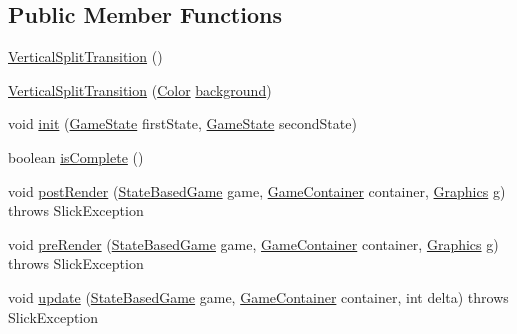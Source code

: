 \subsection*{Public Member Functions}
\begin{DoxyCompactItemize}
\item 
\mbox{\hyperlink{classorg_1_1newdawn_1_1slick_1_1state_1_1transition_1_1_vertical_split_transition_a7fcbd3a7f08c1c24bdeec3871dd3c76f}{Vertical\+Split\+Transition}} ()
\item 
\mbox{\hyperlink{classorg_1_1newdawn_1_1slick_1_1state_1_1transition_1_1_vertical_split_transition_a50db86690430f45012f21202e19c21aa}{Vertical\+Split\+Transition}} (\mbox{\hyperlink{classorg_1_1newdawn_1_1slick_1_1_color}{Color}} \mbox{\hyperlink{classorg_1_1newdawn_1_1slick_1_1state_1_1transition_1_1_vertical_split_transition_ab060d40f8fccd5b704cdfe466e1df6ea}{background}})
\item 
void \mbox{\hyperlink{classorg_1_1newdawn_1_1slick_1_1state_1_1transition_1_1_vertical_split_transition_a1722b29907ee226e0632b6694fe887a7}{init}} (\mbox{\hyperlink{interfaceorg_1_1newdawn_1_1slick_1_1state_1_1_game_state}{Game\+State}} first\+State, \mbox{\hyperlink{interfaceorg_1_1newdawn_1_1slick_1_1state_1_1_game_state}{Game\+State}} second\+State)
\item 
boolean \mbox{\hyperlink{classorg_1_1newdawn_1_1slick_1_1state_1_1transition_1_1_vertical_split_transition_ac2ff9b2c7c657194cfe9e77f2573ef82}{is\+Complete}} ()
\item 
void \mbox{\hyperlink{classorg_1_1newdawn_1_1slick_1_1state_1_1transition_1_1_vertical_split_transition_a54a4f79a015e46a983ff7172be755eb9}{post\+Render}} (\mbox{\hyperlink{classorg_1_1newdawn_1_1slick_1_1state_1_1_state_based_game}{State\+Based\+Game}} game, \mbox{\hyperlink{classorg_1_1newdawn_1_1slick_1_1_game_container}{Game\+Container}} container, \mbox{\hyperlink{classorg_1_1newdawn_1_1slick_1_1_graphics}{Graphics}} g)  throws Slick\+Exception 
\item 
void \mbox{\hyperlink{classorg_1_1newdawn_1_1slick_1_1state_1_1transition_1_1_vertical_split_transition_a2e9f0f1a8f9037f9215919433936e2a6}{pre\+Render}} (\mbox{\hyperlink{classorg_1_1newdawn_1_1slick_1_1state_1_1_state_based_game}{State\+Based\+Game}} game, \mbox{\hyperlink{classorg_1_1newdawn_1_1slick_1_1_game_container}{Game\+Container}} container, \mbox{\hyperlink{classorg_1_1newdawn_1_1slick_1_1_graphics}{Graphics}} g)  throws Slick\+Exception 
\item 
void \mbox{\hyperlink{classorg_1_1newdawn_1_1slick_1_1state_1_1transition_1_1_vertical_split_transition_a72184556b43e32b01f0436d2ea8b0723}{update}} (\mbox{\hyperlink{classorg_1_1newdawn_1_1slick_1_1state_1_1_state_based_game}{State\+Based\+Game}} game, \mbox{\hyperlink{classorg_1_1newdawn_1_1slick_1_1_game_container}{Game\+Container}} container, int delta)  throws Slick\+Exception 
\end{DoxyCompactItemize}
